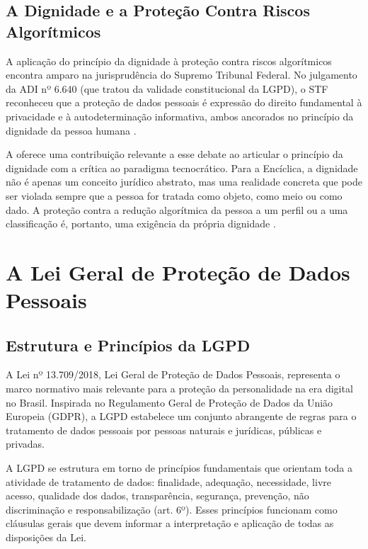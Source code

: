 \subsection{A Dignidade e a Proteção Contra Riscos Algorítmicos}
\label{subsec:dignidade-riscos}

A aplicação do princípio da dignidade à proteção contra riscos algorítmicos encontra amparo na jurisprudência do Supremo Tribunal Federal. No julgamento da ADI nº 6.640 (que tratou da validade constitucional da LGPD), o STF reconheceu que a proteção de dados pessoais é expressão do direito fundamental à privacidade e à autodeterminação informativa, ambos ancorados no princípio da dignidade da pessoa humana \cite{STF2020ADI6640}.

A \MH{} oferece uma contribuição relevante a esse debate ao articular o princípio da dignidade com a crítica ao paradigma tecnocrático. Para a Encíclica, a dignidade não é apenas um conceito jurídico abstrato, mas uma realidade concreta que pode ser violada sempre que a pessoa for tratada como objeto, como meio ou como dado. A proteção contra a redução algorítmica da pessoa a um perfil ou a uma classificação é, portanto, uma exigência da própria dignidade \cite{LeaoXIV2026MH}.

\section{A Lei Geral de Proteção de Dados Pessoais}
\label{sec:lgpd}

\subsection{Estrutura e Princípios da LGPD}
\label{subsec:estrutura-lgpd}

A Lei nº 13.709/2018, Lei Geral de Proteção de Dados Pessoais, representa o marco normativo mais relevante para a proteção da personalidade na era digital no Brasil. Inspirada no Regulamento Geral de Proteção de Dados da União Europeia (GDPR), a LGPD estabelece um conjunto abrangente de regras para o tratamento de dados pessoais por pessoas naturais e jurídicas, públicas e privadas.

A LGPD se estrutura em torno de princípios fundamentais que orientam toda a atividade de tratamento de dados: finalidade, adequação, necessidade, livre acesso, qualidade dos dados, transparência, segurança, prevenção, não discriminação e responsabilização (art. 6º). Esses princípios funcionam como cláusulas gerais que devem informar a interpretação e aplicação de todas as disposições da Lei.

